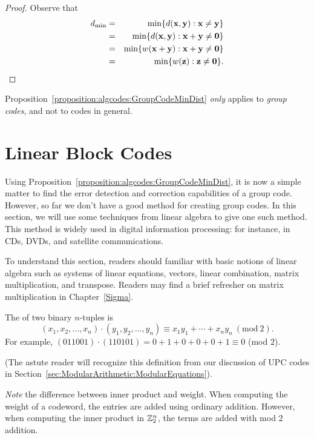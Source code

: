\begin{proof}
Observe that
\begin{eqnarray*}
d_{\min} &= & \min \{ d({\bold x},{\bold y}) : {\bold x}
\neq
{\bold y} \} \\
&= & \min \{ d({\bold x},{\bold y}) : {\bold x}+{\bold y}
\neq {\bold 0} \} \\
&=& \min\{ w({\bold x} + {\bold y}) : {\bold x}+{\bold y}
\neq {\bold 0} \} \\
& = & \min\{ w({\bold z}) : {\bold z} \neq {\bold 0} \}.
\end{eqnarray*}
\end{proof}
 
 \begin{warn}
 Proposition~\ref{proposition:algcodes:GroupCodeMinDist}  \emph{only} applies to \emph{group codes}, and not to codes in general.
 \end{warn}
 
\section{Linear Block Codes}
\label{sec:ErrorAndCorrectionCode:BlockCodes}
  
Using Proposition~\ref{proposition:algcodes:GroupCodeMinDist}, it is now a simple matter to find the error detection and correction capabilities of a group code. However, so far we don't have a good method  for creating group codes. In this section, we will use some techniques from linear algebra to give one such method. This method is widely used in digital information processing: for instance, in CDs, DVDs, and satellite communications.

To understand this section, readers should familiar with basic notions of linear algebra such as systems of linear equations, vectors, linear combination, matrix multiplication, and transpose. Readers may find a brief refresher on matrix multiplication in Chapter~\ref{Sigma}.
 
 \begin{defn}
The  of two binary
$n$-tuples is
\[
(x_1, x_2, \ldots, x_n) \cdot (y_1, y_2, \ldots, y_n) \equiv x_1 y_1 + \cdots + x_n y_n ~(\mathrm{mod~}2).
\]
For example, $(011001) \cdot (110101) = 0+1+0+0+0+1 \equiv 0$ (mod $2$). 

\noindent
(The astute reader will recognize this definition from our discussion of UPC codes in Section~\ref{sec:ModularArithmetic:ModularEquations}).
\end{defn}
\emph{Note} the difference between inner product and weight. When computing the weight of a codeword, the entries are added using ordinary addition. However, when computing the inner product  in ${\Bbb Z_2^n}$, the terms are added  with mod 2 addition.

